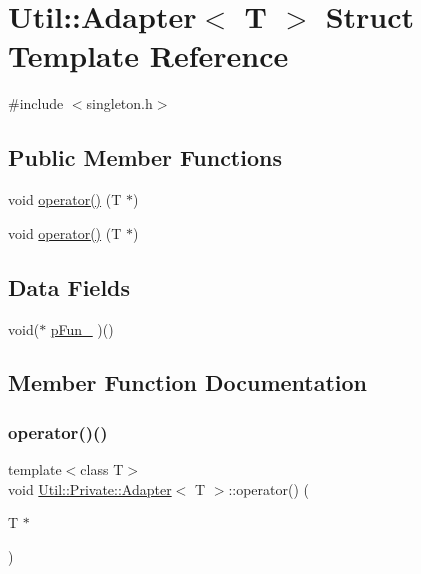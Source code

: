 \hypertarget{structUtil_1_1Private_1_1Adapter}{}\section{Util\+:\+:Adapter$<$ T $>$ Struct Template Reference}
\label{structUtil_1_1Private_1_1Adapter}


{\ttfamily \#include $<$singleton.\+h$>$}

\subsection*{Public Member Functions}
\begin{DoxyCompactItemize}
\item 
void \mbox{\hyperlink{structUtil_1_1Private_1_1Adapter_af610b105c762e6f42233bf8739b4fd87}{operator()}} (T $\ast$)
\item 
void \mbox{\hyperlink{structUtil_1_1Private_1_1Adapter_af610b105c762e6f42233bf8739b4fd87}{operator()}} (T $\ast$)
\end{DoxyCompactItemize}
\subsection*{Data Fields}
\begin{DoxyCompactItemize}
\item 
void($\ast$ \mbox{\hyperlink{structUtil_1_1Private_1_1Adapter_a06bc60369b635819913a35c3ee01e8d0}{p\+Fun\+\_\+}} )()
\end{DoxyCompactItemize}


\subsection{Member Function Documentation}
\mbox{\label{structUtil_1_1Private_1_1Adapter_af610b105c762e6f42233bf8739b4fd87}} 
\subsubsection{\texorpdfstring{operator()()}{operator()()}\hspace{0.1cm}{\footnotesize\ttfamily [1/2]}}
{\footnotesize\ttfamily template$<$class T$>$ \\
void \mbox{\hyperlink{structUtil_1_1Private_1_1Adapter}{Util\+::\+Private\+::\+Adapter}}$<$ T $>$\+::operator() (\begin{DoxyParamCaption}\item[{T $\ast$}]{ }\end{DoxyParamCaption})\hspace{0.3cm}{\ttfamily [inline]}}


